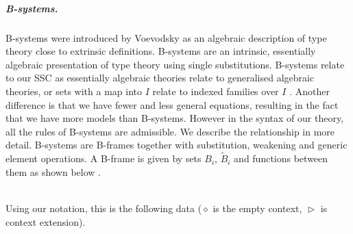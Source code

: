 \documentclass[a4paper,UKenglish,cleveref, autoref, thm-restate]{lipics-v2021}
\newcommand{\Ty}{\mathsf{Ty}}
\newcommand{\Tm}{\mathsf{Tm}}
\newcommand{\ext}{\mathop{\triangleright}}
\begin{document}
\subparagraph*{B-systems.} B-systems were introduced by Voevodsky \cite{voevodsky2014bsystems} as
an algebraic description of type theory close to extrinsic definitions.
B-systems are an intrinsic, essentially
algebraic presentation of type theory using single
substitutions. B-systems relate to our SSC as essentially
algebraic theories relate to generalised algebraic theories, or
sets with a map into $I$ relate to indexed families over $I$
\cite[page 221]{DBLP:journals/apal/Cartmell86}. Another difference is
that we have fewer and less general equations, resulting in the fact
that we have more models than B-systems. However in the syntax of our
theory, all the rules of B-systems are admissible. We describe the
relationship in more detail. B-systems are B-frames together with
substitution, weakening and generic element operations. A B-frame is
given by sets $B_i$, $\tilde{B}_i$ and functions between them as shown
below \cite{AHRENS_EMMENEGGER_NORTH_RIJKE_2023}. \\
 \\
Using our notation, this is the following data ($\diamond$ is the empty context, $\ext$ is context extension). \\
 \\
\end{document}
